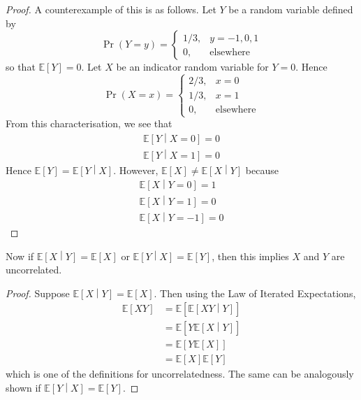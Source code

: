 \documentclass[11pt]{report} %
\begin{document}
\begin{proof}
A counterexample of this is as follows. Let $Y$ be a random variable defined by
\begin{equation}
\operatorname{Pr}\left(Y = y\right) = \begin{cases} 1/3, & y = -1, 0, 1 \\ 0, & \mathrm{elsewhere}\end{cases}
\end{equation}
so that $\mathbb{E}\left[Y\right] = 0$. Let $X$ be an indicator random variable for $Y = 0$. Hence
\begin{equation}
\operatorname{Pr}\left(X = x\right) = \begin{cases} 2/3, & x = 0 \\ 1/3, & x = 1 \\ 0, & \mathrm{elsewhere}\end{cases}
\end{equation}
From this characterisation, we see that
\begin{gather}
\mathbb{E}\left[Y \middle| X = 0\right] = 0 \\
\mathbb{E}\left[Y \middle| X = 1\right] = 0 
\end{gather}
Hence $\mathbb{E}\left[Y\right] = \mathbb{E}\left[Y \middle|X\right]$. However, $\mathbb{E}\left[X\right] \neq \mathbb{E}\left[X \middle|Y\right]$ because
\begin{gather}
\mathbb{E}\left[X \middle| Y = 0\right] = 1 \\
\mathbb{E}\left[X \middle| Y = 1\right] = 0 \\
\mathbb{E}\left[X \middle| Y = -1\right] = 0
\end{gather}
\end{proof}
Now if $\mathbb{E}\left[X\middle|Y\right] = \mathbb{E}\left[X\right]$ or $\mathbb{E}\left[Y\middle|X\right] = \mathbb{E}\left[Y\right]$, then this implies $X$ and $Y$ are uncorrelated.
\begin{proof}
Suppose $\mathbb{E}\left[X\middle|Y\right] = \mathbb{E}\left[X\right]$. Then using the Law of Iterated Expectations,
\begin{align}
\mathbb{E}\left[XY\right] &= \mathbb{E}\left[\mathbb{E}\left[XY\middle|Y\right]\right] \\
&= \mathbb{E}\left[Y\mathbb{E}\left[X\middle|Y\right]\right] \\
&= \mathbb{E}\left[Y\mathbb{E}\left[X\right]\right] \\
&= \mathbb{E}\left[X\right]\mathbb{E}\left[Y\right]
\end{align}
which is one of the definitions for uncorrelatedness. The same can be analogously shown if $\mathbb{E}\left[Y\middle|X\right] = \mathbb{E}\left[Y\right]$.
\end{proof}
\end{document}
